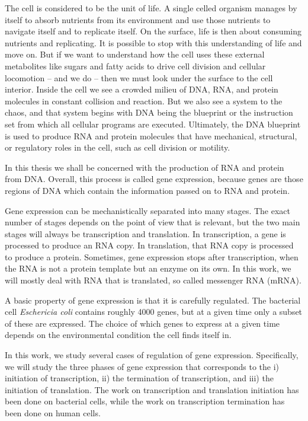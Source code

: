 %

The cell is considered to be the unit of life. A single celled organism manages
by itself to absorb nutrients from its environment and use those nutrients to
navigate itself and to replicate itself. On the surface, life is then about
consuming nutrients and replicating. It is possible to stop with this
understanding of life and move on. But if we want to understand how the cell
uses these external metabolites like sugars and fatty acids to drive cell
division and cellular locomotion -- and we do -- then we must look under the
surface to the cell interior. Inside the cell we see a crowded milieu of DNA,
RNA, and protein molecules in constant collision and reaction. But we also see
a system to the chaos, and that system begins with DNA being the blueprint or
the instruction set from which all cellular programs are executed. Ultimately,
the DNA blueprint is used to produce RNA and protein molecules that have
mechanical, structural, or regulatory roles in the cell, such as cell division
or motility.

In this thesis we shall be concerned with the production of RNA and protein
from DNA. Overall, this process is called gene expression, because genes are
those regions of DNA which contain the information passed on to RNA and protein.

Gene expression can be mechanistically separated into many stages. The exact
number of stages depends on the point of view that is relevant, but the two
main stages will always be transcription and translation. In transcription, a
gene is processed to produce an RNA copy. In translation, that RNA copy is
processed to produce a protein. Sometimes, gene expression stops after
transcription, when the RNA is not a protein template but an enzyme on its own.
In this work, we will mostly deal with RNA that is translated, so called
messenger RNA (mRNA).

A basic property of gene expression is that it is carefully regulated. The
bacterial cell \textit{Eschericia coli} contains roughly 4000 genes, but at a
given time only a subset of these are expressed. The choice of which genes to
express at a given time depends on the environmental condition the cell finds
itself in.

In this work, we study several cases of regulation of gene expression.
Specifically, we will study the three phases of gene expression that
corresponds to the i) initiation of transcription, ii) the termination of
transcription, and iii) the initiation of translation. The work on
transcription and translation initiation has been done on bacterial cells,
while the work on transcription termination has been done on human cells.
